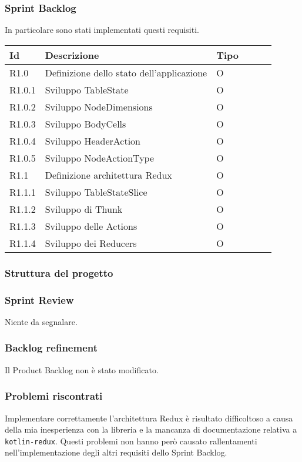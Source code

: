 \subsubsection{Sprint Backlog}
In particolare sono stati implementati questi requisiti.
\begin{longtable} {
		|>{}p{10mm}| 
		|>{}p{90mm}|
		|>{}p{15mm}|
		|>{}p{15mm}|
		|>{}p{15mm}|
		>{}p{0mm}}
	\hline
	\textbf{Id} & \textbf{Descrizione} & \textbf{Tipo} \\ \hline
	R1.0 & Definizione dello stato dell'applicazione & O \\ \hline
	R1.0.1 & Sviluppo TableState        & O\\ \hline
	R1.0.2 & Sviluppo NodeDimensions    & O\\ \hline
	R1.0.3 & Sviluppo BodyCells         & O\\ \hline
	R1.0.4 & Sviluppo HeaderAction      & O\\ \hline
	R1.0.5 & Sviluppo NodeActionType    & O\\ \hline
	R1.1   & Definizione architettura Redux & O\\ \hline
	R1.1.1 & Sviluppo TableStateSlice    & O\\ \hline
	R1.1.2 & Sviluppo di Thunk & O\\ \hline
	R1.1.3 & Sviluppo delle Actions & O\\ \hline
	R1.1.4 & Sviluppo dei Reducers & O\\ \hline
\end{longtable}

\subsubsection{Struttura del progetto}
\subsubsection{Sprint Review}
Niente da segnalare.

\subsubsection{Backlog refinement}
Il Product Backlog non è stato modificato.

\subsubsection{Problemi riscontrati}
Implementare correttamente l'architettura Redux è risultato difficoltoso a causa della mia inesperienza con la libreria e la mancanza di documentazione relativa a \verb|kotlin-redux|. Questi problemi non hanno però causato rallentamenti nell'implementazione degli altri requisiti dello Sprint Backlog.

